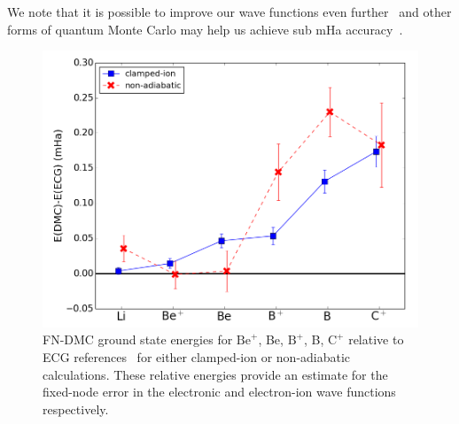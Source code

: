 \documentclass[pra,superscriptaddress,groupedaddress,twocolumn]{revtex4}
\begin{document}
We note that it is possible to improve our wave functions even further~\cite{Morale_Bench,Clay_Bench} and other forms of quantum Monte Carlo may help us achieve sub mHa accuracy~\cite{Tubman_Release,Tubman_ACS}. %

\begin{figure}[h]
\centering
\includegraphics[scale=.37]{Figures/atom-ECG}
\caption{FN-DMC ground state energies for $\text{Be}^+$, Be, $\text{B}^+$, B, $\text{C}^+$ relative to ECG references~\cite{Stanke_Be,Puchalski_Be+,Bubin_BeH_noBO,Bubin_B,Bubin_B+,Bubin_C+} for either clamped-ion or non-adiabatic calculations. These relative energies provide an estimate for the fixed-node error in the electronic and electron-ion wave functions respectively.\label{fig:atom-ECG}}
\end{figure}
\end{document}
